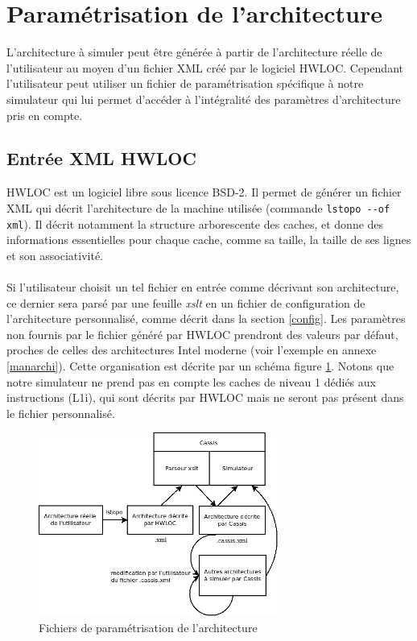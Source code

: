 \section{Paramétrisation de l'architecture}

\label{param_xml}
L'architecture à simuler peut être générée à partir de l'architecture réelle de l'utilisateur au moyen d'un fichier XML créé par le logiciel \textsf{HWLOC}. Cependant l'utilisateur peut utiliser un fichier de paramétrisation spécifique à notre simulateur qui lui permet d'accéder à l'intégralité des paramètres d'architecture pris en compte.

\subsection{Entrée XML HWLOC}

\textsf{HWLOC} est un logiciel libre sous licence BSD-2. Il permet de générer un fichier XML qui décrit l'architecture de la machine utilisée (commande \verb?lstopo --of xml?). Il décrit notamment la structure arborescente des caches, et donne des informations essentielles pour chaque cache, comme sa taille, la taille de ses lignes et son associativité. 

\paragraph{}
Si l'utilisateur choisit un tel fichier en entrée comme décrivant son architecture, ce dernier sera parsé par une feuille \textit{xslt} en un fichier de configuration de l'architecture personnalisé, comme décrit dans la section \ref{config}. Les paramètres non fournis par le fichier généré par \textsf{HWLOC} prendront des valeurs par défaut, proches de celles des architectures \textsf{Intel} moderne (voir l'exemple en annexe \ref{manarchi}). Cette organisation est décrite par un schéma figure \ref{img:archi}. Notons que notre simulateur ne prend pas en compte les caches de niveau 1 dédiés aux instructions (L1i), qui sont décrits par \textsf{HWLOC} mais ne seront pas présent dans le fichier personnalisé.

\begin{figure}[!h]
\begin{center}
   \includegraphics[width=0.7\textwidth]{images/schema_archi.png}
   \caption{\label{img:archi} Fichiers de paramétrisation de l'architecture}
\end{center}
\end{figure}

